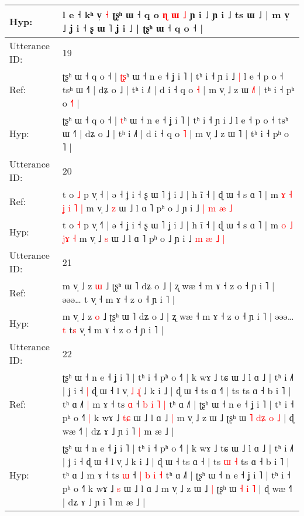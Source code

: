 \documentclass[10pt]{article}
\DeclareRobustCommand{\hl}[1]{{\textcolor{red}{#1}}}
\begin{document}
\begin{longtable}{ll}
 \\
Hyp: & l e ˧ kʰ v̩\hl{}\hl{} \hl{˧} ʈʂʰ ɯ ˧ q o\hl{ }\hl{ɳ}\hl{ }\hl{ɯ} \hl{˩} ɲ i ˩ ɲ i ˩ ts ɯ ˩ | m v̩ ˩\hl{}\hl{}\hl{}\hl{}\hl{}\hl{} ʝ i ˧ ʂ ɯ ˥ ʝ i ˩ | ʈʂʰ ɯ ˧ q o ˧ |
 \\
\midrule
Utterance ID: & 19 \\
Ref: & ʈʂʰ ɯ ˧ q o ˧ | \hl{ʈ}\hl{ʂ}ʰ ɯ ˧ n e ˧ ʝ i ˥ | tʰ i ˧ ɲ i ˩\hl{ }\hl{|} l e ˧ p o ˧ tsʰ ɯ ˧˥ | dʑ o ˩ | tʰ i ˩˥ | d i ˧ q o \hl{˧} | m v̩ ˩ z ɯ \hl{˩}˥ | tʰ i ˧ pʰ o \hl{˧}˥ |
 \\
Hyp: & ʈʂʰ ɯ ˧ q o ˧ | \hl{}\hl{t}ʰ ɯ ˧ n e ˧ ʝ i ˥ | tʰ i ˧ ɲ i ˩\hl{}\hl{} l e ˧ p o ˧ tsʰ ɯ ˧˥ | dʑ o ˩ | tʰ i ˩˥ | d i ˧ q o \hl{˥} | m v̩ ˩ z ɯ \hl{}˥ | tʰ i ˧ pʰ o \hl{}˥ |
 \\
\midrule
Utterance ID: & 20 \\
Ref: & t o \hl{˩} p v̩ ˧\hl{} | ə ˧ ʝ i ˧ ʂ ɯ ˥ ʝ i ˩ | h ĩ ˧ | ɖ ɯ ˧ s ɑ ˥ | m\hl{ }\hl{ɤ} \hl{˧} \hl{ʝ} \hl{i}\hl{ }\hl{˥} \hl{|} m v̩ ˩ \hl{z} ɯ ˩ l ɑ ˥ pʰ o ˩ ɲ i ˩ \hl{|} \hl{m} \hl{æ} \hl{˩}
 \\
Hyp: & t o \hl{˧} p v̩ ˧\hl{˥} | ə ˧ ʝ i ˧ ʂ ɯ ˥ ʝ i ˩ | h ĩ ˧ | ɖ ɯ ˧ s ɑ ˥ | m\hl{}\hl{} \hl{o} \hl{˩} \hl{}\hl{j}\hl{ɤ} \hl{˧} m v̩ ˩ \hl{s} ɯ ˩ l ɑ ˥ pʰ o ˩ ɲ i ˩ \hl{m} \hl{æ} \hl{˩} \hl{|}
 \\
\midrule
Utterance ID: & 21 \\
Ref: & m v̩ ˩ z \hl{ɯ} ˩ ʈʂʰ ɯ ˥ dʑ o ˩ | ʐ wæ ˧ m ɤ ˧ z o ˧ ɲ i ˥ | əəə…\hl{}\hl{} t\hl{} v̩ ˧ m ɤ ˧ z o ˧ ɲ i ˥ |
 \\
Hyp: & m v̩ ˩ z \hl{o} ˩ ʈʂʰ ɯ ˥ dʑ o ˩ | ʐ wæ ˧ m ɤ ˧ z o ˧ ɲ i ˥ | əəə…\hl{ }\hl{t} t\hl{s} v̩ ˧ m ɤ ˧ z o ˧ ɲ i ˥ |
 \\
\midrule
Utterance ID: & 22 \\
Ref: & ʈʂʰ ɯ ˧ n e ˧ ʝ i ˥ | tʰ i ˧ pʰ o ˧˥ | k wɤ ˩ tɕ ɯ ˩ l ɑ ˩ | tʰ i ˩˥ | ʝ i ˧\hl{ }\hl{|} ɖ ɯ ˧ l v̩\hl{ }\hl{˩}\hl{ }\hl{ɻ}\hl{̍} ˩ k i ˩ | ɖ ɯ ˧ ts ɑ ˧\hl{˥} | ts\hl{}\hl{}\hl{}\hl{} ts ɑ ˧ b i ˥ | tʰ ɑ ˩\hl{˥}\hl{ }\hl{|} m ɤ ˧ ts \hl{ɑ} ˧ \hl{b} \hl{i} \hl{˥} \hl{|} tʰ ɑ ˩˥ | ʈʂʰ ɯ ˧ n e ˧ ʝ i ˥ | tʰ i ˧ pʰ o ˧˥\hl{ }\hl{|} k wɤ ˩ \hl{t}\hl{ɕ} ɯ ˩ l ɑ ˩\hl{ }\hl{|} m v̩ ˩ z ɯ ˩\hl{}\hl{} ʈʂʰ ɯ\hl{ }\hl{˥} \hl{d}\hl{ʑ} \hl{o} \hl{˩} | ɖ wæ ˧˥ | dʑ ɤ ˩ ɲ i ˥\hl{ }\hl{|} m æ ˩ |
 \\
Hyp: & ʈʂʰ ɯ ˧ n e ˧ ʝ i ˥ | tʰ i ˧ pʰ o ˧˥ | k wɤ ˩ tɕ ɯ ˩ l ɑ ˩ | tʰ i ˩˥ | ʝ i ˧\hl{}\hl{} ɖ ɯ ˧ l v̩\hl{}\hl{}\hl{}\hl{}\hl{} ˩ k i ˩ | ɖ ɯ ˧ ts ɑ ˧\hl{} | ts\hl{ }\hl{ɯ}\hl{ }\hl{˧} ts ɑ ˧ b i ˥ | tʰ ɑ ˩\hl{}\hl{}\hl{} m ɤ ˧ ts \hl{ɯ} ˧ \hl{|} \hl{b} \hl{i} \hl{˧} tʰ ɑ ˩˥ | ʈʂʰ ɯ ˧ n e ˧ ʝ i ˥ | tʰ i ˧ pʰ o ˧˥\hl{}\hl{} k wɤ ˩ \hl{}\hl{s} ɯ ˩ l ɑ ˩\hl{}\hl{} m v̩ ˩ z ɯ ˩\hl{ }\hl{|} ʈʂʰ ɯ\hl{}\hl{} \hl{}\hl{˧} \hl{i} \hl{˥} | ɖ wæ ˧˥ | dʑ ɤ ˩ ɲ i ˥\hl{}\hl{} m æ ˩ |

\end{longtable}
\end{document}
